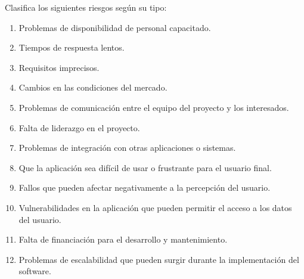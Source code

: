 
\begin{enunciado}
    Clasifica los siguientes riesgos según su tipo:
    \begin{enumerate}
        \item Problemas de disponibilidad de personal capacitado.
        \item Tiempos de respuesta lentos.
        \item Requisitos imprecisos.
        \item Cambios en las condiciones del mercado.
        \item Problemas de comunicación entre el equipo del proyecto y los interesados.
        \item Falta de liderazgo en el proyecto.
        \item Problemas de integración con otras aplicaciones o sistemas.
        \item Que la aplicación sea difícil de usar o frustrante para el usuario final.
        \item Fallos que pueden afectar negativamente a la percepción del usuario.
        \item Vulnerabilidades en la aplicación que pueden permitir el acceso a los datos del usuario.
        \item Falta de financiación para el desarrollo y mantenimiento.
        \item Problemas de escalabilidad que pueden surgir durante la implementación del software.
    \end{enumerate}
\end{enunciado}

